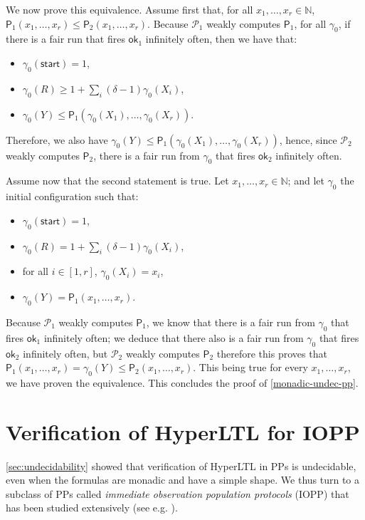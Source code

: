 \documentclass[10pt,a4paper]{article}
\let\mathbb\mathds
\renewcommand{\geq}{\geqslant}
\renewcommand{\leq}{\leqslant}
\newcommand{\nats}{\mathbb{N}}
\newcommand{\nset}[2]{[#1,#2]}
\newcommand{\prot}{\mathcal{P}}
\newcommand{\config}{\gamma}
\newcommand{\aconfig}{\config}
\newcommand*{\apoly}{\mathsf{P}}
\newcommand*{\startstate}{\mathsf{start}}
\newcommand*{\statex}[1]{X_{#1}}
\newcommand*{\okaction}{\mathsf{ok}}
\newcommand{\statey}{Y}
\newcommand{\maxexp}{\delta}
\newcommand{\reservoirstate}{R}
\begin{document}
\begin{toappendix}
	We now prove this equivalence.
	Assume first that, for all \(x_1, \dots, x_r \in \nats\), \(\apoly_1(x_1, \dots, x_r) \leq \apoly_2(x_1, \dots, x_r)\).
	Because \(\prot_1\) weakly computes \(\apoly_1\), for all \(\config_0\), if there is a fair run that fires \(\okaction_1\) infinitely often, then we have that:
	\begin{itemize}[noitemsep,topsep=0pt,parsep=0pt,partopsep=0pt]
		\item \(\config_0(\startstate) = 1\),
		\item \(\config_0(\reservoirstate) \geq 1 + \sum_i (\maxexp-1) \config_0(\statex{i})\),
		\item \(\config_0(\statey) \leq \apoly_1(\config_0(\statex{1}), \dots, \config_0(\statex{r}))\).
	\end{itemize}
	Therefore, we also have \(\config_0(\statey) \leq \apoly_1(\config_0(\statex{1}), \dots, \config_0(\statex{r}))\), hence, since \(\prot_2\) weakly computes \(\apoly_2\), there is a fair run from \(\aconfig_0\) that fires \(\okaction_2\) infinitely often.

	Assume now that the second statement is true.
	Let \(x_1, \dots, x_r \in \nats\); and let \(\config_0\) the initial configuration such that:
	\begin{itemize}[noitemsep,topsep=0pt,parsep=0pt,partopsep=0pt]
		\item \(\config_0(\startstate) = 1\),
		\item \(\config_0(\reservoirstate) =  1 + \sum_i (\maxexp-1) \config_0(\statex{i})\),
		\item for all \(i \in \nset{1}{r}\), \(\config_0(\statex{i}) = x_i\),
		\item \(\config_0(\statey) = \apoly_1(x_1, \dots, x_r)\).
	\end{itemize}
	Because \(\prot_1\) weakly computes \(\apoly_1\), we know that there is a fair run from \(\config_0\) that fires \(\okaction_1\) infinitely often; we deduce that there also is a fair run from \(\config_0\) that fires \(\okaction_2\) infinitely often, but \(\prot_2\) weakly computes \(\apoly_2\) therefore this proves that \(\apoly_1(x_1, \dots, x_r) = \config_0(\statey) \leq \apoly_2(x_1, \dots, x_r)\).
	This being true for every \(x_1, \dots, x_r\), we have proven the equivalence.
	This concludes the proof of \cref{monadic-undec-pp}.
\end{toappendix}

%
%
%
%
\section{Verification of HyperLTL for IOPP}
\label{sec:iopp-verif}
\cref{sec:undecidability} showed that verification of HyperLTL in PPs is undecidable, even when the formulas are monadic and have a simple shape.
We thus turn to a subclass of PPs called \emph{immediate observation population protocols} (IOPP) \cite{Comp-Power-Pop-Prot} that has been studied extensively (see e.g. \cite{ERW19,JancarV22,BlondinL23,BGKMWW24}).
\end{document}
